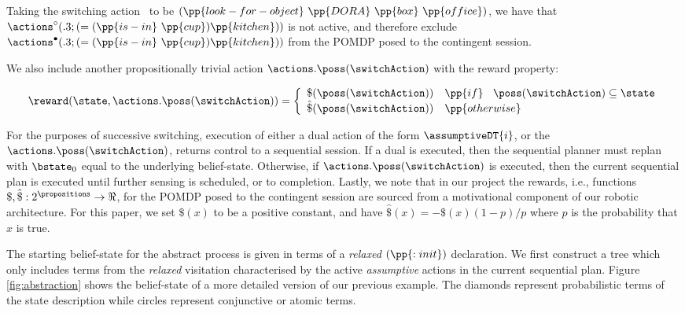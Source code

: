 \noindent Taking the switching action \switchAction\ to be
$(\pp{look-for-object}~\pp{DORA}~\pp{box}~\pp{office})$, we have that
$\actions^{\circ}(.3;(=(\pp{is-in}~\pp{cup})\pp{kitchen}))$ is not
active, and therefore exclude
$\actions^{\bullet}(.3;(=(\pp{is-in}~\pp{cup})\pp{kitchen}))$ from the
POMDP posed to the contingent session. 

We also include another propositionally trivial action
$\actions.\poss(\switchAction)$ with the reward property:

\[
\reward(\state, \actions.\poss(\switchAction)) = \bigg\{ \begin{array}{ll}
\$(\poss(\switchAction)) & \pp{if}~\;\; \poss(\switchAction) \subseteq \state \\
\hat\$(\poss(\switchAction)) & \pp{otherwise} \\
\end{array}
\]

For the purposes of successive switching, execution of either a dual
action of the form $\assumptiveDT{i}$, or the
$\actions.\poss(\switchAction)$, returns control to a sequential
session. If a dual is executed, then the sequential planner must
replan with $\bstate_0$ equal to the underlying
belief-state. Otherwise, if $\actions.\poss(\switchAction)$ is
executed, then the current sequential plan is executed until further
sensing is scheduled, or to completion. Lastly, we note that in our
project the rewards, i.e., functions
$\$,\hat\$:2^\propositions\to\Re$, for the POMDP posed to the
contingent session are sourced from a motivational component of our
robotic architecture. For this paper, we set $\$(x)$ to be a positive
constant, and have $\hat\$(x)= - \$(x)(1 - p) / p$ where $p$ is the
probability that $x$ is true.


The starting belief-state for the abstract process is given in terms
of a {\em relaxed} $(\pp{:init})$ declaration. We first construct a
tree which only includes terms from the {\em relaxed} visitation
characterised by the active {\em assumptive} actions in the current
sequential plan. Figure \ref{fig:abstraction} shows the belief-state
of a more detailed version of our previous example. The diamonds
represent probabilistic terms of the state description while circles
represent conjunctive or atomic terms. 

